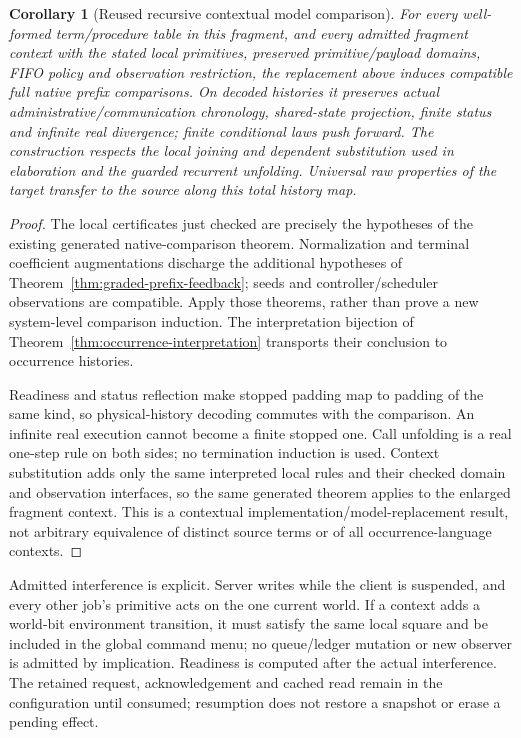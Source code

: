 \documentclass[11pt]{article}
\newtheorem{corollary}[theorem]{Corollary}
\begin{document}
\begin{corollary}[Reused recursive contextual model comparison]\label{cor:occurrence-reuse}
For every well-formed term/procedure table in this fragment, and every admitted fragment context with the stated local primitives, preserved primitive/payload domains, FIFO policy and observation restriction, the replacement above induces compatible full native prefix comparisons. On decoded histories it preserves actual administrative/communication chronology, shared-state projection, finite status and infinite real divergence; finite conditional laws push forward. The construction respects the local joining and dependent substitution used in elaboration and the guarded recurrent unfolding. Universal raw properties of the target transfer to the source along this total history map.
\end{corollary}
\begin{proof}
The local certificates just checked are precisely the hypotheses of the existing generated native-comparison theorem. Normalization and terminal coefficient augmentations discharge the additional hypotheses of Theorem~\ref{thm:graded-prefix-feedback}; seeds and controller/scheduler observations are compatible. Apply those theorems, rather than prove a new system-level comparison induction. The interpretation bijection of Theorem~\ref{thm:occurrence-interpretation} transports their conclusion to occurrence histories.

Readiness and status reflection make stopped padding map to padding of the same kind, so physical-history decoding commutes with the comparison. An infinite real execution cannot become a finite stopped one. Call unfolding is a real one-step rule on both sides; no termination induction is used. Context substitution adds only the same interpreted local rules and their checked domain and observation interfaces, so the same generated theorem applies to the enlarged fragment context. This is a contextual implementation/model-replacement result, not arbitrary equivalence of distinct source terms or of all occurrence-language contexts.
\end{proof}

Admitted interference is explicit. Server writes while the client is suspended, and every other job's primitive acts on the one current world. If a context adds a world-bit environment transition, it must satisfy the same local square and be included in the global command menu; no queue/ledger mutation or new observer is admitted by implication. Readiness is computed after the actual interference. The retained request, acknowledgement and cached read remain in the configuration until consumed; resumption does not restore a snapshot or erase a pending effect.
\end{document}
